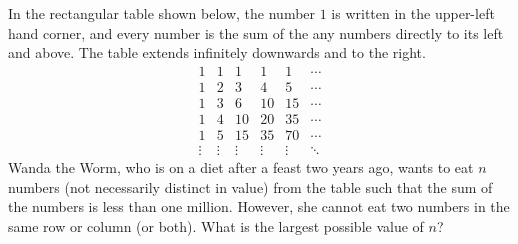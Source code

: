 In the rectangular table shown below, the number $1$ is written in the upper-left hand corner, and every number is the sum of the any numbers directly to its left and above.  The table extends infinitely downwards and to the right.
\[ 
	\begin{array}{cccccc}
	  1 & 1 & 1 & 1 & 1 & \cdots \\
	  1 & 2 & 3 & 4 & 5 & \cdots \\
	  1 & 3 & 6 & 10 & 15 & \cdots \\
	  1 & 4 & 10 & 20 & 35 & \cdots \\
	  1 & 5 & 15 & 35 & 70 & \cdots \\
	  \vdots & \vdots & \vdots & \vdots & \vdots & \ddots
	\end{array}
\]
Wanda the Worm, who is on a diet after a feast two years ago, wants to eat $n$ numbers (not necessarily distinct in value) from the table such that the sum of the numbers is less than one million. However, she cannot eat two numbers in the same row or column (or both). What is the largest possible value of $n$?
